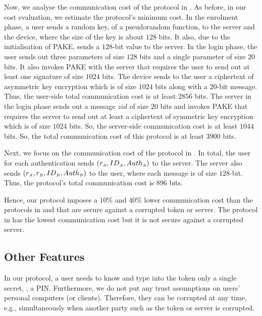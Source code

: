 Now, we analyse the communication cost of the protocol in \cite{JareckiJKSS21}. As before, in our cost evaluation, we estimate the protocol's minimum cost.  In the enrolment phase, a user sends a random key, of a pseudorandom function, to the server and the device, where the size of the key is about $128$ bits. It also, due to the initialisation of PAKE, sends a $128$-bit value to the server. In the login phase, the user sends out three parameters of size $128$ bits and a single parameter of size $20$ bits.  It also invokes PAKE with the server that requires the user to send out at least one signature of size $1024$ bits. The device sends to the user a ciphertext of asymmetric key encryption which is of size $1024$ bits along with a $20$-bit message. Thus, the user-side total communication cost is at least $2856$ bits. The server in the login phase sends out a message $zid$ of size $20$ bits and invokes PAKE that requires the server to send out at least a ciphertext of symmetric key encryption which is of size $1024$ bits.  So, the server-side communication cost is at least $1044$ bits. So, the total communication cost of this protocol is at least $3900$ bits. 

Next, we focus on the communication cost of the protocol in \cite{MatsuoMY11}. In total, the user for each authentication sends   $(r_{\scriptscriptstyle A}, ID_{\scriptscriptstyle A}, Auth_{\scriptscriptstyle A})$ to the server. The server also sends $(r_{\scriptscriptstyle A}, r_{\scriptscriptstyle B}, ID_{\scriptscriptstyle B}, Auth_{\scriptscriptstyle B})$ to the user, where each message is of size $128$-bit. Thus, the protocol's total communication cost is $896$ bits. 


Hence, our protocol imposes a $10\%$ and $40\%$ lower communication cost than the protocols in \cite{WangW18} and \cite{JareckiJKSS21} that are secure against a corrupted token or server. The protocol in \cite{MatsuoMY11} has the lowest communication cost but it is not secure against a corrupted server. 


\subsection{Other Features}
 In our protocol, a user needs to know and type into the token only a single secret, \ie, a PIN. Furthermore, we do not put any trust assumptions on users' personal computers (or clients). Therefore, they can be corrupted at any time, e.g., simultaneously when another party such as the token or server is corrupted. 
 
